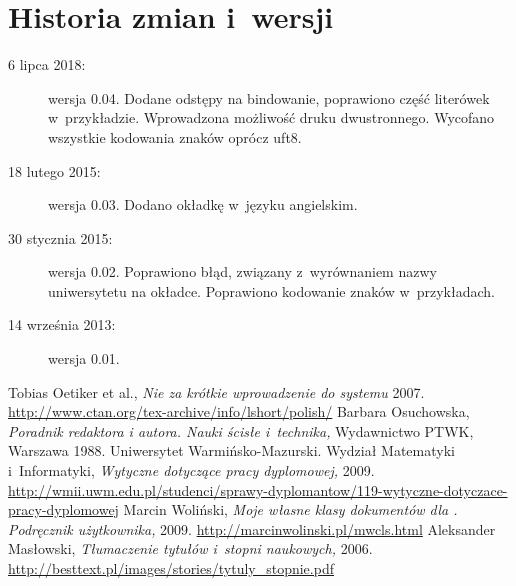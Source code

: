 \chapter{Historia zmian i~wersji}
\begin{description}
 \item [6 lipca 2018:] wersja 0.04. Dodane odstępy na bindowanie, poprawiono część literówek w~przykładzie. Wprowadzona możliwość druku dwustronnego. Wycofano wszystkie kodowania znaków oprócz uft8.
 \item [18 lutego 2015:] wersja 0.03. Dodano okładkę w~języku angielskim.
 \item [30 stycznia 2015:] wersja 0.02. Poprawiono błąd, związany z~wyrównaniem nazwy uniwersytetu na okładce. Poprawiono kodowanie znaków w~przykładach.
 \item [14 września 2013:] wersja 0.01.
\end{description}



Tobias Oetiker et al., \textit{Nie za krótkie wprowadzenie
do systemu \LaTeXe}
2007. \url{http://www.ctan.org/tex-archive/info/lshort/polish/}
Barbara Osuchowska, \textit{Poradnik redaktora i autora. Nauki ścisłe i~technika,} Wydawnictwo PTWK, Warszawa 1988.
Uniwersytet Warmińsko-Mazurski.
Wydział Matematyki
i~Informatyki, \textit{Wytyczne dotyczące pracy dyplomowej,}
2009. \url{http://wmii.uwm.edu.pl/studenci/sprawy-dyplomantow/119-wytyczne-dotyczace-pracy-dyplomowej}
Marcin Woliński, \textit{Moje własne klasy dokumentów dla \LaTeXe. Podręcznik użytkownika,}
2009. \url{http://marcinwolinski.pl/mwcls.html}
Aleksander Masłowski, \textit{Tłumaczenie tytułów i~stopni naukowych,}
2006. \url{http://besttext.pl/images/stories/tytuly_stopnie.pdf}
